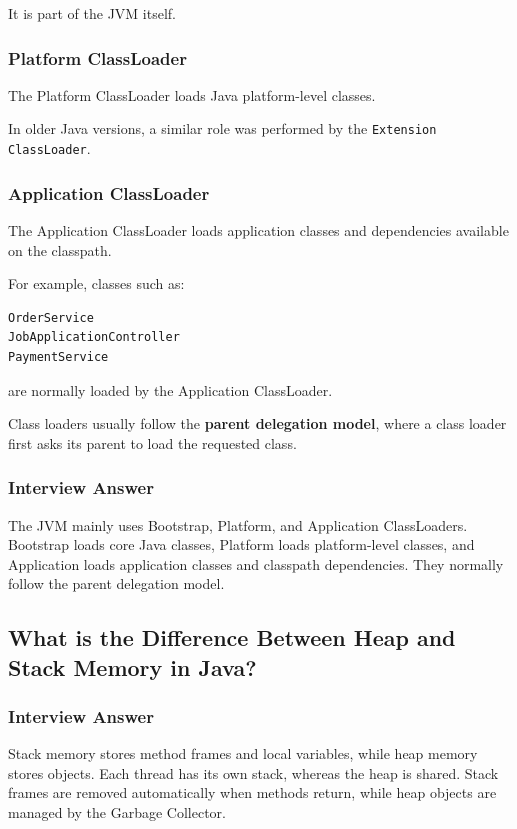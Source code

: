 \documentclass[12pt,a4paper]{article}
\begin{document}
It is part of the JVM itself.

\subsubsection*{Platform ClassLoader}

The Platform ClassLoader loads Java platform-level classes.

In older Java versions, a similar role was performed by the
\texttt{Extension ClassLoader}.

\subsubsection*{Application ClassLoader}

The Application ClassLoader loads application classes and dependencies
available on the classpath.

For example, classes such as:

\begin{verbatim}
OrderService
JobApplicationController
PaymentService
\end{verbatim}

are normally loaded by the Application ClassLoader.

Class loaders usually follow the \textbf{parent delegation model}, where a
class loader first asks its parent to load the requested class.

\subsubsection*{Interview Answer}

The JVM mainly uses Bootstrap, Platform, and Application ClassLoaders.
Bootstrap loads core Java classes, Platform loads platform-level classes,
and Application loads application classes and classpath dependencies.
They normally follow the parent delegation model.

\subsection{What is the Difference Between Heap and Stack Memory in Java?}

\subsubsection*{Interview Answer}

Stack memory stores method frames and local variables, while heap memory
stores objects. Each thread has its own stack, whereas the heap is shared.
Stack frames are removed automatically when methods return, while heap
objects are managed by the Garbage Collector.
\end{document}
